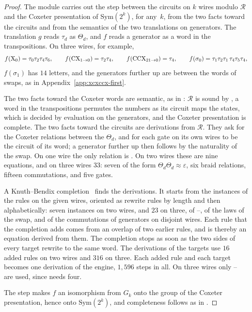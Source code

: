 \documentclass[acmsmall,screen,nonacm]{acmart}
\begin{document}
\begin{proof}
The module  carries out the step between the circuits on $k$ wires modulo $\mathcal{R}$ and the Coxeter presentation of $\mathrm{Sym}(2^k)$, for any~$k$, from the two facts toward the circuits and from the semantics of the two translations on generators. The translation $g$ reads $\tau_d$ as $\Theta_d$, and $f$ reads a generator as a word in the transpositions. On three wires, for example,
\[
f(\mathrm{X}_0)=\tau_0\tau_2\tau_4\tau_6,\qquad f(\mathrm{CX}_{1\to0})=\tau_2\tau_4,\qquad f(\mathrm{CCX}_{21\to0})=\tau_4,\qquad f(\sigma_0)=\tau_1\tau_2\tau_1\,\tau_4\tau_5\tau_4,
\]
$f(\sigma_1)$ has $14$ letters, and the generators further up are between the words of swaps, as in Appendix~\ref{app:xcxccx-first}.

The two facts toward the Coxeter words are semantic, as in : $\mathcal{R}$ is sound by , a word in the transpositions permutes the numbers as its circuit maps the states, which is decided by evaluation on the generators, and the Coxeter presentation is complete. The two facts toward the circuits are derivations from $\mathcal{R}$. They ask for the Coxeter relations between the $\Theta_d$, and for each gate on its own wires to be the circuit of its word; a generator further up then follows by the naturality of the swap. On one wire the only relation is . On two wires these are nine equations, and on three wires $33$: seven of the form $\Theta_d\Theta_d\approx\varepsilon$, six braid relations, fifteen commutations, and five gates.

A Knuth--Bendix completion~\cite{knuth1970simple} finds the derivations. It starts from the instances of the rules on the given wires, oriented as rewrite rules by length and then alphabetically: seven instances on two wires, and $23$ on three, of --, of the laws of the swap, and of the commutations of generators on disjoint wires. Each rule that the completion adds comes from an overlap of two earlier rules, and is thereby an equation derived from them. The completion stops as soon as the two sides of every target rewrite to the same word. The derivations of the targets use $16$ added rules on two wires and $316$ on three. Each added rule and each target becomes one derivation of the engine, $1{,}596$ steps in all. On three wires only -- are used, since  needs four.

The step makes $f$ an isomorphism from $G_k$ onto the group of the Coxeter presentation, hence onto $\mathrm{Sym}(2^k)$, and completeness follows as in .
\end{proof}
\end{document}
